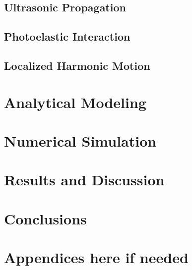 \documentclass[10pt,a4paper]{eitExjobb}
\begin{document}
	\section{Ultrasonic Propagation}
	
	\section{Photoelastic Interaction}
	
	\section{Localized Harmonic Motion}
	
	\chapter{Analytical Modeling}
	
	\chapter{Numerical Simulation}
	
	\chapter{Results and Discussion}
	
	\chapter{Conclusions}
	
	
	
	
	\appendix
	
	\chapter{Appendices here if needed}
	
\end{document}
